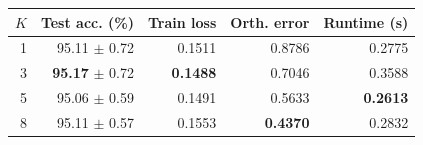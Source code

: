 \footnotesize
\begin{tabular}{rrrrr}
\toprule
$K$ & Test acc. (\%) & Train loss & Orth. error & Runtime (s) \\
\midrule
1 & 95.11 $\pm$ 0.72 & 0.1511 & 0.8786 & 0.2775 \\
3 & \textbf{95.17} $\pm$ 0.72 & \textbf{0.1488} & 0.7046 & 0.3588 \\
5 & 95.06 $\pm$ 0.59 & 0.1491 & 0.5633 & \textbf{0.2613} \\
8 & 95.11 $\pm$ 0.57 & 0.1553 & \textbf{0.4370} & 0.2832 \\
\bottomrule
\end{tabular}
